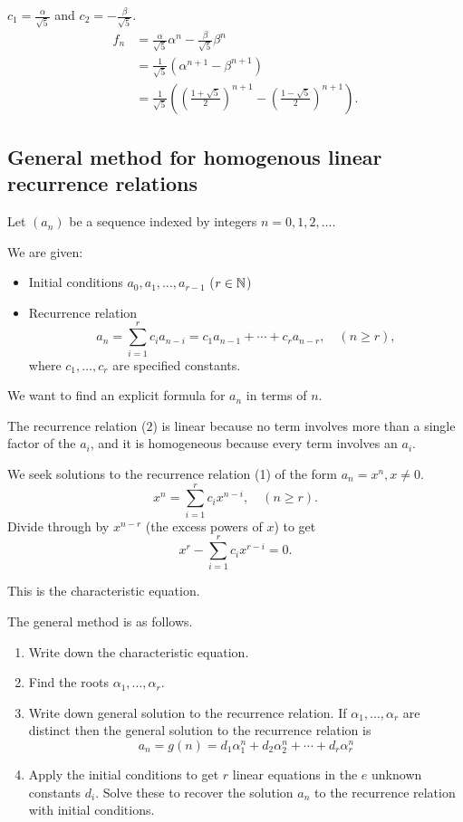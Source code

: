 \documentclass[10pt, a4paper]{article}
\begin{document}
$c_1 = \frac{\alpha}{\sqrt{5}}$ and $c_2 = -\frac{\beta}{\sqrt{5}}$.
\begin{align*}
    f_n &= \frac{\alpha}{\sqrt{5}}\alpha ^ n - \frac{\beta}{\sqrt{5}}\beta ^ n \\
    &= \frac{1}{\sqrt{5}}(\alpha ^ {n + 1} - \beta ^ {n + 1}) \\
    &= \frac{1}{\sqrt{5}}\left(\left(\frac{1 + \sqrt{5}}{2}\right) ^ {n + 1} - \left(\frac{1 - \sqrt{5}}{2}\right) ^ {n + 1}\right).
\end{align*}

\subsection{General method for homogenous linear recurrence relations}
Let $(a_n)$ be a sequence indexed by integers $n = 0, 1, 2, \dotsc$.

We are given:
\begin{itemize}
    \item Initial conditions $a_0, a_1, \dotsc, a_{r - 1}$ ($r \in \mathbb{N}$)
    \item Recurrence relation
    \begin{equation}
        a_n = \sum_{i = 1}^{r}c_ia_{n - i} = c_1a_{n - 1} + \dotsi + c_ra_{n - r},\quad (n \geq r),
    \end{equation}
    where $c_1, \dotsc, c_r$ are specified constants.
\end{itemize}

We want to find an explicit formula for $a_n$ in terms of $n$.

The recurrence relation ($2$) is linear because no term involves more than a single factor of the $a_i$,
and it is homogeneous because every term involves an $a_i$.

We seek solutions to the recurrence relation (1) of the form $a_n = x ^ n, x \neq 0$.
\[
x ^ n = \sum_{i = 1}^{r}c_i x ^ {n - i},\quad(n \geq r).
\]
Divide through by $x ^ {n - r}$ (the excess powers of $x$) to get
\begin{equation}
    x ^ r - \sum_{i = 1}^{r}c_i x ^ {r - i} = 0.
\end{equation}

This is the characteristic equation.

The general method is as follows.
\begin{enumerate}[label = \textbf{Step \arabic*}]
    \item Write down the characteristic equation.
    \item Find the roots $\alpha_1, \dotsc, \alpha_r$.
    \item Write down general solution to the recurrence relation.
    If $\alpha_1, \dotsc, \alpha_r$ are distinct then the general solution to the recurrence relation is
    \[
    a_n = g(n) = d_1\alpha_1 ^ n + d_2 \alpha_2 ^ n + \dotsi + d_r \alpha_r ^ n
    \]
    \item Apply the initial conditions to get $r$ linear equations in the $e$ unknown constants $d_i$.
    Solve these to recover the solution $a_n$ to the recurrence relation with initial conditions.
\end{enumerate}
\end{document}
